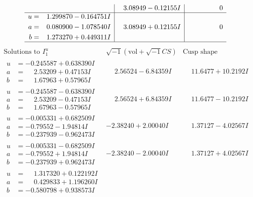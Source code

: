 \documentclass[1p]{elsarticle_modified}
\theoremstyle{definition}
\newcommand{\I}{\sqrt{-1}}
\begin{document}
$$\begin{array}{c|c|c}
 & \phantom{-}3.08949 - 0.12155 I & \phantom{-0.000000 } 0 \\ \hline\begin{aligned}
u &= \phantom{-}1.299870 - 0.164751 I \\
a &= \phantom{-}0.080900 - 1.078540 I \\
b &= \phantom{-}1.273270 + 0.449311 I\end{aligned}
 & \phantom{-}3.08949 + 0.12155 I & \phantom{-0.000000 } 0\\
 \hline 
 \end{array}$$\newpage$$\begin{array}{c|c|c}  
\text{Solutions to }I^u_{1}& \I (\text{vol} + \sqrt{-1}CS) & \text{Cusp shape}\\
 \hline 
\begin{aligned}
u &= -0.245587 + 0.638390 I \\
a &= \phantom{-}2.53209 + 0.47153 I \\
b &= \phantom{-}1.67963 + 0.57965 I\end{aligned}
 & \phantom{-}2.56524 - 6.84359 I & \phantom{-}11.6477 + 10.2192 I \\ \hline\begin{aligned}
u &= -0.245587 - 0.638390 I \\
a &= \phantom{-}2.53209 - 0.47153 I \\
b &= \phantom{-}1.67963 - 0.57965 I\end{aligned}
 & \phantom{-}2.56524 + 6.84359 I & \phantom{-}11.6477 - 10.2192 I \\ \hline\begin{aligned}
u &= -0.005331 + 0.682509 I \\
a &= -0.79552 - 1.94814 I \\
b &= -0.237939 - 0.962473 I\end{aligned}
 & -2.38240 + 2.00040 I & \phantom{-}1.37127 - 4.02567 I \\ \hline\begin{aligned}
u &= -0.005331 - 0.682509 I \\
a &= -0.79552 + 1.94814 I \\
b &= -0.237939 + 0.962473 I\end{aligned}
 & -2.38240 - 2.00040 I & \phantom{-}1.37127 + 4.02567 I \\ \hline\begin{aligned}
u &= \phantom{-}1.317320 + 0.122192 I \\
a &= \phantom{-}0.429833 + 1.196260 I \\
b &= -0.580798 + 0.938573 I\end{aligned}

\end{array}$$
\end{document}
